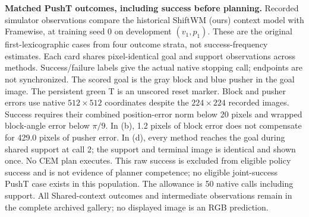 \textbf{Matched PushT outcomes, including success before planning.}
Recorded simulator observations compare the historical ShiftWM (ours) context model with Framewise, at training seed 0 on development $(v_1,p_1)$. These are the original first-lexicographic cases from four outcome strata, not success-frequency estimates.
Each card shares pixel-identical goal and support observations across methods. Success/failure labels give the actual native stopping call; endpoints are not synchronized. The scored goal is the gray block and blue pusher in the goal image. The persistent green T is an unscored reset marker.
Block and pusher errors use native $512\times512$ coordinates despite the $224\times224$ recorded images. Success requires their combined position-error norm below 20 pixels and wrapped block-angle error below $\pi/9$. In (b), 1.2 pixels of block error does not compensate for 429.0 pixels of pusher error.
In (d), every method reaches the goal during shared support at call 2; the support and terminal image is identical and shown once. No CEM plan executes. This raw success is excluded from eligible policy success and is not evidence of planner competence; no eligible joint-success PushT case exists in this population.
The allowance is 50 native calls including support. All Shared-context outcomes and intermediate observations remain in the complete archived gallery; no displayed image is an RGB prediction.
